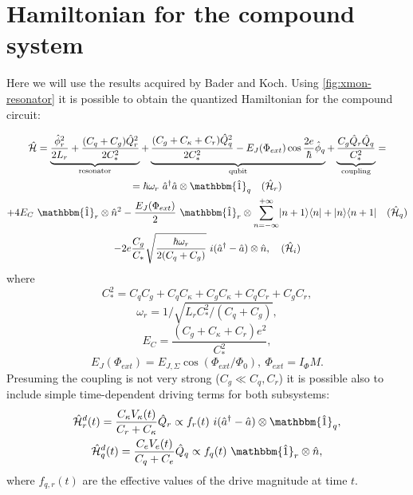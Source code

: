 \documentclass[12pt]{report}
\DeclarePairedDelimiter\bra{\langle}{\rvert}
\DeclarePairedDelimiter\ket{\lvert}{\rangle}
\numberwithin{equation}{section}
\begin{document}
\section{Hamiltonian for the compound system}

Here we will use the results acquired by Bader\cite{Bader2013} and Koch\cite{Koch2007}. Using \autoref{fig:xmon-resonator} it is possible to obtain the quantized Hamiltonian for the compound circuit:

\begin{equation}
\begin{gathered}
\mathcal{\hat H} =  \underbrace{\frac{\hat \phi_r^2}{2 L_r} + \frac{(C_q+C_g) \hat Q_r^2}{2C_*^2}}_\text{resonator} 
+ \underbrace{\frac{(C_g + C_\kappa + C_r) \hat Q^2_q}{2C_*^2} - E_J (\Phi_{ext}) \cos \frac{2e}{\hbar}\hat \phi_q }_\text{qubit}
+ \underbrace{\frac{C_g\hat Q_r \hat Q_q}{C_*^2}}_\text{coupling} = \\
=  \hbar\omega_r\ \hat a^\dag \hat a \otimes \mathbbm{\hat 1}_q \quad (\mathcal{\hat H}_r) \\
+ 4 E_C\ \mathbbm{\hat 1}_r \otimes \hat n^2 - \frac{E_J(\Phi_{ext})}{2}\ \mathbbm{\hat 1}_r\otimes \sum_{n=-\infty}^{+\infty} \ket{n+1}\bra{n} + \ket{n}\bra{n+1} \quad (\mathcal{\hat H}_q) \\
- 2e \frac{C_g}{C_*} \sqrt{\frac{\hbar \omega_r }{2(C_q+C_g)}}\ i(\hat a^\dag - \hat a) \otimes \hat n, \quad (\mathcal{\hat H}_i)
\end{gathered}\label{eq:hamiltonian}
\end{equation}
where 
$$C_*^2 = C_q C_g + C_q C_\kappa + C_g C_\kappa + C_q C_r + C_g C_r, $$
$$\omega_r = 1/\sqrt{L_r C_*^2/(C_q+C_g)}, $$
$$E_C = \frac{(C_g+C_\kappa+C_r)e^2}{C_*^2}, $$
$$E_J(\Phi_{ext}) = E_{J,\Sigma} \cos(\Phi_{ext}/\Phi_0),\ \Phi_{ext} = I_\Phi M.$$
Presuming the coupling is not very strong ($C_g \ll C_q, C_r$) it is possible also to include simple time-dependent driving terms for both subsystems:
\begin{gather}
\mathcal{\hat H}_r^d(t) = \frac{C_\kappa V_\kappa(t)}{C_r + C_\kappa} \hat Q_r \propto f_r(t)\ i(\hat a^\dag - \hat a) \otimes \mathbbm{\hat 1}_q, \notag \\
\mathcal{\hat H}_q^d(t) = \frac{C_e V_e(t)}{C_q + C_e} \hat Q_q \propto f_q(t)\  \mathbbm{\hat 1}_r \otimes \hat n,
\label{eq:driving_q}
\end{gather}
where $f_{q, r} (t)$ are the effective values of the drive magnitude at time $t$.
\end{document}
